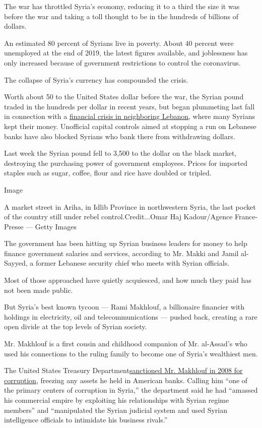 The war has throttled Syria's economy, reducing it to a third the size
it was before the war and taking a toll thought to be in the hundreds of
billions of dollars.

An estimated 80 percent of Syrians live in poverty. About 40 percent
were unemployed at the end of 2019, the latest figures available, and
joblessness has only increased because of government restrictions to
control the coronavirus.

The collapse of Syria's currency has compounded the crisis.

Worth about 50 to the United States dollar before the war, the Syrian
pound traded in the hundreds per dollar in recent years, but began
plummeting last fall in connection with a
\href{https://www.nytimes.com/2020/05/10/world/middleeast/lebanon-economic-crisis.html}{financial
crisis in neighboring Lebanon}, where many Syrians kept their money.
Unofficial capital controls aimed at stopping a run on Lebanese banks
have also blocked Syrians who bank there from withdrawing dollars.

Last week the Syrian pound fell to 3,500 to the dollar on the black
market, destroying the purchasing power of government employees. Prices
for imported staples such as sugar, coffee, flour and rice have doubled
or tripled.

Image

A market street in Ariha, in Idlib Province in northwestern Syria, the
last pocket of the country still under rebel control.Credit...Omar Haj
Kadour/Agence France-Presse --- Getty Images

The government has been hitting up Syrian business leaders for money to
help finance government salaries and services, according to Mr. Makki
and Jamil al-Sayyed, a former Lebanese security chief who meets with
Syrian officials.

Most of those approached have quietly acquiesced, and how much they paid
has not been made public.

But Syria's best known tycoon --- Rami Makhlouf, a billionaire financier
with holdings in electricity, oil and telecommunications --- pushed
back, creating a rare open divide at the top levels of Syrian society.

Mr. Makhlouf is a first cousin and childhood companion of Mr. al-Assad's
who used his connections to the ruling family to become one of Syria's
wealthiest men.

The United States Treasury
Department\href{https://www.treasury.gov/press-center/press-releases/Pages/hp834.aspx}{sanctioned
Mr. Makhlouf in 2008 for corruption}, freezing any assets he held in
American banks. Calling him ``one of the primary centers of corruption
in Syria,'' the department said he had ``amassed his commercial empire
by exploiting his relationships with Syrian regime members'' and
``manipulated the Syrian judicial system and used Syrian intelligence
officials to intimidate his business rivals.''

